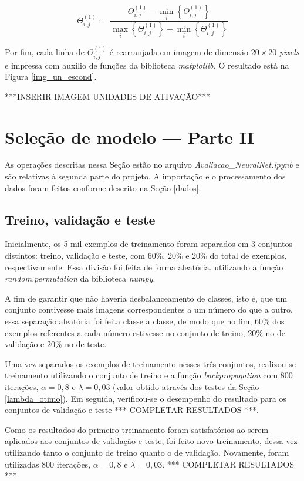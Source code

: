 \documentclass[12pt]{article}
\begin{document}
\begin{equation} \label{scaling}
\Theta^{(1)}_{i,j} := \frac{ \Theta^{(1)}_{i,j} - \min\limits_i\left\{\Theta^{(1)}_{i,j}\right\}}{\max\limits_i\left\{\Theta^{(1)}_{i,j}\right\} - \min\limits_i\left\{\Theta^{(1)}_{i,j}\right\}}
\end{equation}

Por fim, cada linha de $\Theta^{(1)}_{i,j}$ é rearranjada em imagem de dimensão $20 \times 20$ \textit{pixels} e impressa com auxílio de funções da biblioteca \textit{matplotlib.} O resultado está na Figura \ref{img_un_escond}.

***INSERIR IMAGEM UNIDADES DE ATIVAÇÃO*** 

\section{Seleção de modelo --- Parte II} \label{parte2}
As operações descritas nessa Seção estão no arquivo \textit{Avaliacao\_NeuralNet.ipynb} e são relativas à segunda parte do projeto. A importação e o processamento dos dados foram feitos conforme descrito na Seção \ref{dados}.


\subsection{Treino, validação e teste} \label{treino, val, teste}
\indent Inicialmente, os 5 mil exemplos de treinamento foram separados em 3 conjuntos distintos: treino, validação e teste, com 60\%, 20\% e 20\% do total de exemplos, respectivamente. Essa divisão foi feita de forma aleatória, utilizando a função \textit{random.permutation} da biblioteca \textit{numpy}.

A fim de garantir que não haveria desbalanceamento de classes, isto é, que um conjunto contivesse mais imagens correspondentes a um número do que a outro, essa separação aleatória foi feita classe a classe, de modo que no fim, 60\% dos exemplos referentes a cada número estivesse no conjunto de treino, 20\% no de validação e 20\% no de teste.

Uma vez separados os exemplos de treinamento nesses três conjuntos, realizou-se treinamento utilizando o conjunto de treino e a função \textit{backpropagation} com 800 iterações, $\alpha = 0,8$ e $\lambda=0,03$ (valor obtido através dos testes da Seção \ref{lambda_otimo}). Em seguida, verificou-se o desempenho do resultado para os conjuntos de validação e teste *** COMPLETAR RESULTADOS ***.

Como os resultados do primeiro treinamento foram satisfatórios ao serem aplicados aos conjuntos de validação e teste, foi feito novo treinamento, dessa vez utilizando tanto o conjunto de treino quanto o de validação. Novamente, foram utilizadas 800 iterações, $\alpha = 0,8$ e $\lambda=0,03$. *** COMPLETAR RESULTADOS ***
\end{document}
